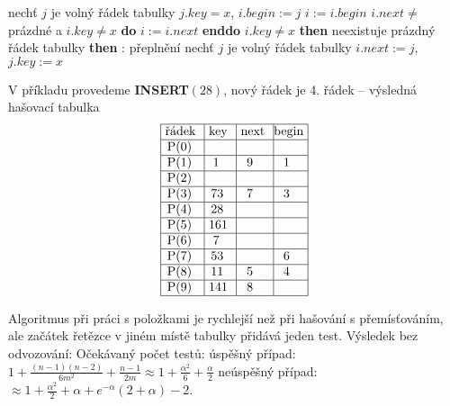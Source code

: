 \documentclass[a4paper,12pt]{article}
\begin{document}
\phantom{------}{\bf else}\newline 
\phantom{---------}nech\v t $j$ je volný řádek tabulky\newline 
\phantom{---------}$j.key=x$, $i.begin:=j$\newline 
\phantom{------}{\bf endif}\newline 
\phantom{---}{\bf endif\newline 
else}\newline 
\phantom{---}$i:=i.begin$\newline
\phantom{---}{\bf while} $i.next\ne$prázdné a $i.key\ne x$ {\bf do} $i:=i.next$ {\bf enddo}\newline 
\phantom{---}{\bf if} $i.key\ne x$ {\bf then}\newline 
\phantom{------}{\bf if} neexistuje prázdný řádek tabulky {\bf then}\newline 
\phantom{---------}{\bf Výstup}: přeplnění\newline 
\phantom{------}{\bf else}\newline 
\phantom{---------}nech\v t $j$ je volný řádek tabulky\newline 
\phantom{---------}$i.next:=j$, $j.key:=x$\newline 
\phantom{------}{\bf endif}\newline 
\phantom{---}{\bf endif\newline 
endif}
\bigskip

V příkladu provedeme {\bf INSERT$(28)$}, nový řádek je 4. 
řádek\newline 
-- výsledná hašovací tabulka
$$\vtop{\offinterlineskip\halign {\strut\vrule\ # & \vrule\ # & \vrule\ # & \vrule \hfil # \hfil \vrule\cr\noalign{\hrule}řádek & key & next & begin\hfil \cr\noalign{\hrule}P(0) & & &\hfill \cr\noalign{\hrule}P(1) & 1 & 9 & 1 \cr\noalign{\hrule}P(2) & & &\hfill \cr\noalign{\hrule}P(3) & 73 & 7 & 3 \cr\noalign{\hrule}P(4) & 28 &  &\hfill \cr\noalign{\hrule}P(5) & 161 & & \hfill \cr\noalign{\hrule}P(6) & 7 & &\hfill \cr\noalign{\hrule}P(7) & 53 & & 6 \cr\noalign{\hrule}P(8) & 11 & 5 & 4  \cr\noalign{\hrule}P(9) & 141 & 8 & \hfill \cr\noalign{\hrule}}}$$

Algoritmus při práci s položkami je rychlejší než při 
hašování s přemís\v továním, ale začátek řetězce v 
jiném místě tabulky přidává jeden test. Výsledek bez 
odvozování:\newline 
Očekávaný počet testů:\newline 
\phantom{---}úspěšný případ: $1+\frac {(n-1)(n-2
)}{6m^2}+\frac {n-1}{2m}\approx 1+\frac {\alpha^2}6+\frac {\alpha}
2$\newline 
\phantom{---}neúspěšný případ: $\approx 1+\frac {
\alpha^2}2+\alpha +e^{-\alpha}(2+\alpha )-2$.
\end{document}
